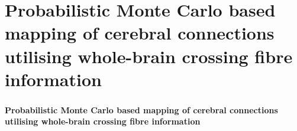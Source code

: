 \documentclass[10pt]{beamer}
\begin{document}
\section{Probabilistic Monte Carlo based mapping of cerebral connections utilising whole-brain crossing fibre information}
\begin{frame}
  \frametitle{}
  \framesubtitle{}

  \begin{Large}
  \begin{center}
  \textbf{Probabilistic Monte Carlo based mapping of cerebral connections utilising whole-brain crossing fibre information}
  \end{center}
  \end{Large}
\end{frame}
\end{document}
